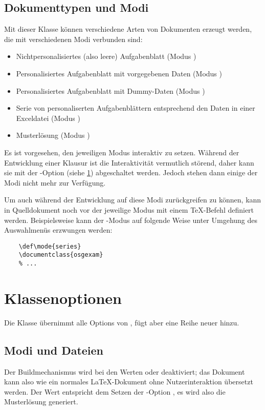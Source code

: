 \documentclass[
load=osgexam,
babel=ngerman
]{skdoc}
\begin{document}
\subsection{Dokumenttypen und Modi}
\label{sec:doctypes}
Mit dieser Klasse können verschiedene Arten von Dokumenten erzeugt werden, die mit verschiedenen Modi verbunden sind:
\begin{itemize}[nosep]
  \item Nichtpersonalisiertes (also leere) Aufgabenblatt (Modus )
  \item Personalisiertes Aufgabenblatt mit vorgegebenen Daten (Modus )
  \item Personalisiertes Aufgabenblatt mit Dummy-Daten (Modus )
  \item Serie von personaliserten Aufgabenblättern entsprechend den Daten in einer Exceldatei (Modus )
  \item Musterlösung  (Modus )
\end{itemize}
Es ist vorgesehen, den jeweiligen Modus interaktiv zu setzen.
Während der Entwicklung einer Klausur ist die Interaktivität vermutlich störend, daher kann sie mit der
-Option (siehe \ref{sec:options}) abgeschaltet werden. Jedoch stehen dann einige der Modi nicht mehr zur
Verfügung.

Um auch während der Entwicklung auf diese Modi zurückgreifen zu können, kann in Quelldokument noch vor
 der jeweilige Modus mit einem \TeX-Befehl definiert werden.
Beispielsweise kann der -Modus auf folgende Weise unter Umgehung des Auswahlmenüs erzwungen werden:
\begin{lstlisting}
    \def\mode{series}
    \documentclass{osgexam}
    % ...
\end{lstlisting}

\section{Klassenoptionen}
\label{sec:options}
Die Klasse übernimmt alle Options von , fügt aber eine Reihe neuer hinzu.

\subsection*{Modi und Dateien}
Der Buildmechanismus wird bei den Werten  oder  deaktiviert; das Dokument kann also wie ein
normales \LaTeX-Dokument ohne Nutzerinteraktion übersetzt werden. Der Wert  entspricht dem Setzen der
-Option , es wird also die Musterlösung generiert.
\end{document}

